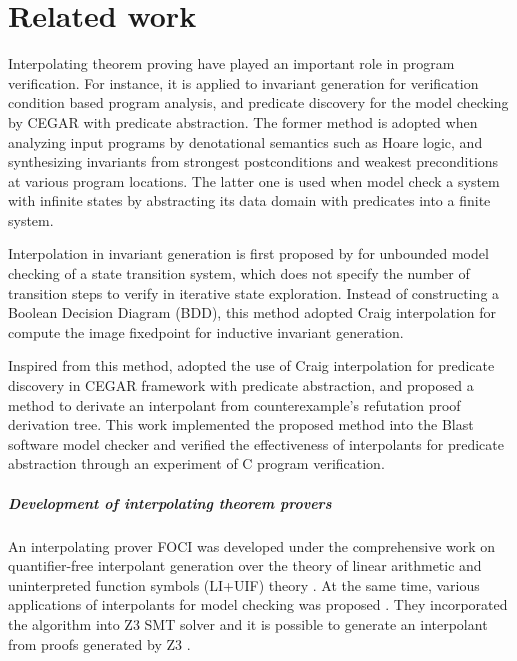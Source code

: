 \chapter{Related work}
\label{chap:related}

Interpolating theorem proving have played an important role in program
verification.  For instance, it is applied to invariant generation for
verification condition based program analysis, and predicate discovery
for the model checking by CEGAR with predicate abstraction.  The
former method is adopted when analyzing input programs by denotational
semantics such as Hoare logic, and synthesizing invariants from
strongest postconditions and weakest preconditions at various program
locations.  The latter one is used when model check a system with
infinite states by abstracting its data domain with predicates into a
finite system.

Interpolation in invariant generation is first proposed
by \cite{conf/cav/McMillan03} for unbounded model checking of a state
transition system, which does not specify the number of transition
steps to verify in iterative state exploration.  Instead of
constructing a Boolean Decision Diagram (BDD), this method adopted
Craig interpolation for compute the image fixedpoint for inductive
invariant generation.

Inspired from this method, \cite{conf/popl/HenzingerJMM04} adopted the
use of Craig interpolation for predicate discovery in CEGAR framework
with predicate abstraction, and proposed a method to derivate an
interpolant from counterexample's refutation proof derivation tree.
This work implemented the proposed method into the Blast software
model checker \cite{conf/popl/HenzingerJMS02,journals/sttt/BeyerHJM07}
and verified the effectiveness of interpolants for predicate
abstraction through an experiment of C program verification.

\paragraph{Development of interpolating theorem provers}
An interpolating prover \textsc{FOCI} \cite{website/foci} was
developed under the comprehensive work on quantifier-free interpolant
generation over the theory of linear arithmetic and uninterpreted
function symbols (LI+UIF) theory \cite{journals/tcs/McMillan05}.  At the same
time, various applications of interpolants for model checking was
proposed \cite{conf/tacas/McMillan05}. They incorporated the algorithm
into Z3 SMT solver \cite{conf/tacas/MouraB08} and it is possible to
generate an interpolant from proofs generated by
Z3 \cite{conf/fmcad/McMillan11}.



